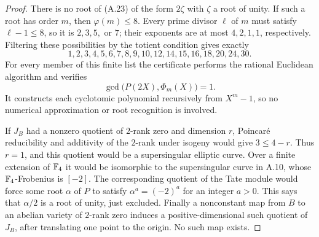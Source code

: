\begin{proof}
There is no root of (A.23) of the form $2\zeta$ with
$\zeta$ a root of unity. If such a root has order $m$, then
$\varphi(m)\le8$. Every prime divisor $\ell$ of $m$ must
satisfy $\ell-1\le8$, so it is $2,3,5,$ or $7$; their
exponents are at most $4,2,1,1$, respectively. Filtering
these possibilities by the totient condition gives exactly
\[
 1,2,3,4,5,6,7,8,9,10,12,14,15,16,18,20,24,30.
\]
For every member of this finite list the certificate performs
the rational Euclidean algorithm and verifies
\[
 \gcd\bigl(P(2X),\Phi_m(X)\bigr)=1.
\]
It constructs each cyclotomic polynomial recursively from
$X^m-1$, so no numerical approximation or root recognition
is involved.

If $J_B$ had a nonzero quotient of $2$-rank zero and dimension
$r$, Poincar\'e reducibility and additivity of the $2$-rank
under isogeny would give $3\le4-r$. Thus $r=1$, and this
quotient would be a supersingular elliptic curve. Over a
finite extension of $\mathbb F_4$ it would be isomorphic to the
supersingular curve in A.10, whose $\mathbb F_4$-Frobenius is
$[-2]$. The corresponding quotient of the Tate module would
force some root $\alpha$ of $P$ to satisfy
$\alpha^a=(-2)^a$ for an integer $a>0$. This says that
$\alpha/2$ is a root of unity, just excluded. Finally a
nonconstant map from $B$ to an abelian variety of $2$-rank
zero induces a positive-dimensional such quotient of $J_B$,
after translating one point to the origin. No such map exists.
\end{proof}

